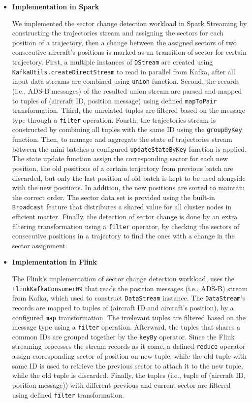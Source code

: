 \documentclass[]{article}
\begin{document}
 \begin{itemize}
 \item {\bf{Implementation in Spark }}
 
 We implemented the sector change detection workload in Spark Streaming by constructing the trajectories stream and assigning the sectors for each position of a trajectory, then a change between the assigned sectors of two consecutive aircraft's positions is marked  as  an transition of sector for certain trajectory. First, a multiple instances of \texttt{DStream} are created using \texttt{KafkaUtils.createDirectStream} to read in  parallel from Kafka, after  all input data streams are combined using \texttt{union} function. Second, the records (i.e., ADS-B messages) of the resulted union stream are parsed and mapped to tuples of (aircraft ID, position message) using defined \texttt{mapToPair} transformation. Third, the unrelated  tuples are filtered based on the message type through a \texttt{filter} operation. Fourth, the trajectories stream is constructed by combining all tuples with the same ID using the \texttt{groupByKey} function. Then, to manage and aggregate the state of trajectories stream between the mini-batches a configured \texttt{updateStateByKey} function is applied. The state update function assign the corresponding sector for each new position, the old positions of a certain trajectory from previous batch are discarded, but only the last position of old batch is kept to be used alongside with the new positions. In addition, the new positions are sorted to maintain the correct order.
 The sector data set is provided using the built-in \texttt{Broadcast} feature that distributes a shared value for  all cluster nodes in efficient matter. Finally, the detection of sector change is done by an extra filtering transformation using a \texttt{filter} operator, by checking the sectors of consecutive positions in a trajectory to find the ones with a change in the sector assignment.

 
  
 \item {\bf{Implementation in Flink }}
 
 The Flink's implementation of sector change detection workload, uses the \texttt{FlinkKafkaConsumer09} that reads the position messages (i.e., ADS-B) stream from Kafka, which used to construct \texttt{DataStream} instance. The \texttt{DataStream}'s records are mapped to tuples of (aircraft ID and aircraft's position), by a configured \texttt{map} transformation. The irrelevant tuples are filtered based on the message type using a \texttt{filter} operation. Afterward, the tuples that shares a common IDs are grouped together by the \texttt{keyBy} operator. Since the Flink streaming processes the stream records as it come, a defined \texttt{reduce} operator assign corresponding sector of position on new tuple, while the old tuple with same ID is used to retrieve the previous sector to attach it to the new tuple, while the old tuple is discarded. Finally, the tuples (i.e., tuple of (aircraft ID, position message)) with different previous and current sector are filtered using defined \texttt{filter} transformation.

 \end{itemize}
 
\end{document}
